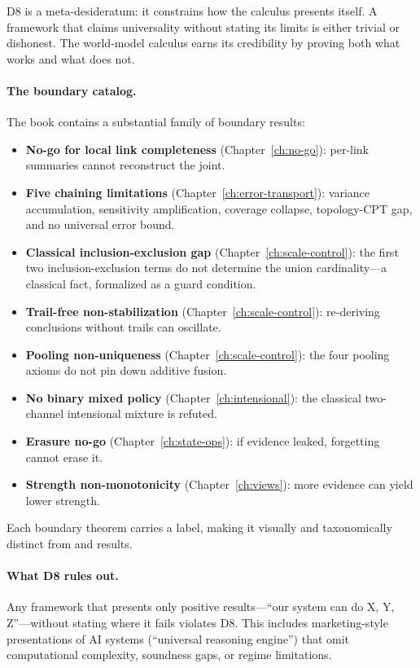 \documentclass[11pt,openany]{report}
\begin{document}
\noindent
D8 is a meta-desideratum: it constrains how the calculus presents
itself.  A framework that claims universality without stating its
limits is either trivial or dishonest.  The world-model calculus earns
its credibility by proving both what works and what does not.

\paragraph{The boundary catalog.}
The book contains a substantial family of boundary results:
\begin{itemize}
\item \textbf{No-go for local link completeness}
  (Chapter~\ref{ch:no-go}): per-link summaries cannot reconstruct
  the joint.
\item \textbf{Five chaining limitations}
  (Chapter~\ref{ch:error-transport}): variance accumulation,
  sensitivity amplification, coverage collapse, topology-CPT gap,
  and no universal error bound.
\item \textbf{Classical inclusion-exclusion gap}
  (Chapter~\ref{ch:scale-control}): the first two
  inclusion-exclusion terms do not determine the union
  cardinality---a classical fact, formalized as a guard condition.
\item \textbf{Trail-free non-stabilization}
  (Chapter~\ref{ch:scale-control}): re-deriving conclusions without
  trails can oscillate.
\item \textbf{Pooling non-uniqueness}
  (Chapter~\ref{ch:scale-control}): the four pooling axioms do not
  pin down additive fusion.
\item \textbf{No binary mixed policy}
  (Chapter~\ref{ch:intensional}): the classical two-channel
  intensional mixture is refuted.
\item \textbf{Erasure no-go}
  (Chapter~\ref{ch:state-ops}): if evidence leaked, forgetting
  cannot erase it.
\item \textbf{Strength non-monotonicity}
  (Chapter~\ref{ch:views}): more evidence can yield lower strength.
\end{itemize}

\noindent
Each boundary theorem carries a \claimBoundary{} label, making it
visually and taxonomically distinct from \claimCore{} and
\claimConditional{} results.

\paragraph{What D8 rules out.}
Any framework that presents only positive results---``our system can
do X, Y, Z''---without stating where it fails violates D8.  This
includes marketing-style presentations of AI systems (``universal
reasoning engine'') that omit computational complexity, soundness
gaps, or regime limitations.
\end{document}
